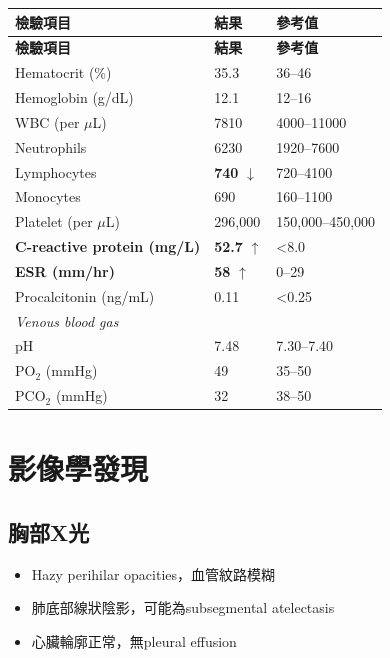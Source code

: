 \documentclass[12pt,a4paper]{article}
\begin{document}
\begin{longtable}{p{6cm}p{4cm}p{4cm}}
\toprule
\textbf{檢驗項目} & \textbf{結果} & \textbf{參考值} \\
\midrule
\endfirsthead
\toprule
\textbf{檢驗項目} & \textbf{結果} & \textbf{參考值} \\
\midrule
\endhead
\bottomrule
\endfoot
Hematocrit (\%) & 35.3 & 36--46 \\
Hemoglobin (g/dL) & 12.1 & 12--16 \\
WBC (per $\mu$L) & 7810 & 4000--11000 \\
\quad Neutrophils & 6230 & 1920--7600 \\
\quad Lymphocytes & \textbf{740} $\downarrow$ & 720--4100 \\
\quad Monocytes & 690 & 160--1100 \\
Platelet (per $\mu$L) & 296,000 & 150,000--450,000 \\
\midrule
\textbf{C-reactive protein (mg/L)} & \textbf{52.7} $\uparrow$ & <8.0 \\
\textbf{ESR (mm/hr)} & \textbf{58} $\uparrow$ & 0--29 \\
Procalcitonin (ng/mL) & 0.11 & <0.25 \\
\midrule
\multicolumn{3}{l}{\textit{Venous blood gas}} \\
pH & 7.48 & 7.30--7.40 \\
PO$_2$ (mmHg) & 49 & 35--50 \\
PCO$_2$ (mmHg) & 32 & 38--50 \\
\end{longtable}


\section{影像學發現}

\subsection{胸部X光}
\begin{itemize}
    \item Hazy perihilar opacities，血管紋路模糊
    \item 肺底部線狀陰影，可能為subsegmental atelectasis
    \item 心臟輪廓正常，無pleural effusion
\end{itemize}
\end{document}
